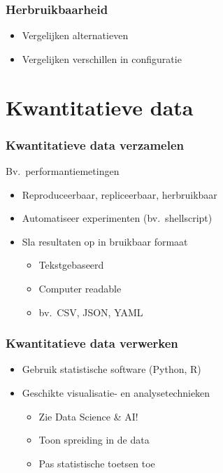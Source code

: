 \documentclass[aspectratio=169]{beamer}
\begin{document}
\begin{frame}
  \frametitle{Herbruikbaarheid}


  \bigskip

  \begin{itemize}
    \item Vergelijken alternatieven
    \item Vergelijken verschillen in configuratie
  \end{itemize}

\end{frame}

\section{Kwantitatieve data}

\begin{frame}
  \frametitle{Kwantitatieve data verzamelen}

  Bv.\ performantiemetingen

  \begin{itemize}
    \item Reproduceerbaar, repliceerbaar, herbruikbaar
    \item Automatiseer experimenten (bv.\ shellscript)
    \item Sla resultaten op in bruikbaar formaat
          \begin{itemize}
            \item Tekstgebaseerd
            \item Computer readable
            \item bv.\ CSV, JSON, YAML
          \end{itemize}
  \end{itemize}

\end{frame}

\begin{frame}
  \frametitle{Kwantitatieve data verwerken}

  \begin{itemize}
    \item Gebruik statistische software (Python, R)
    \item Geschikte visualisatie- en analysetechnieken
          \begin{itemize}
            \item Zie Data Science \& AI!
            \item Toon spreiding in de data
            \item Pas statistische toetsen toe
          \end{itemize}
  \end{itemize}

\end{frame}
\end{document}
